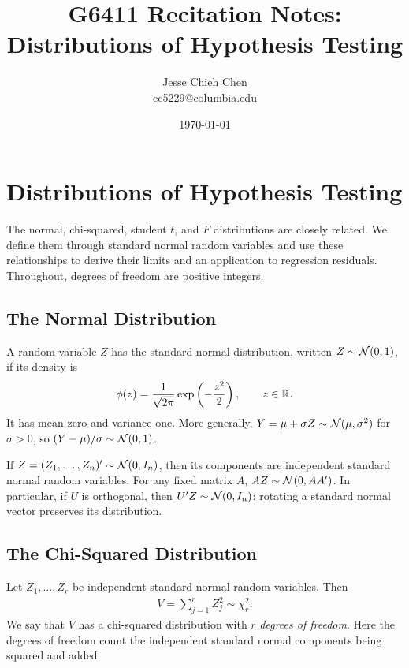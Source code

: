 \documentclass[a4paper,12pt]{article}
\title{G6411 Recitation Notes: Distributions of Hypothesis Testing}
\author{Jesse Chieh Chen\\\href{mailto:cc5229@columbia.edu}{cc5229@columbia.edu}}
\date{\today}
\begin{document}
\appendix
\section{Distributions of Hypothesis Testing}

The normal, chi-squared, student $t$, and $F$ distributions are closely related.
We define them through standard normal random variables and use these relationships
to derive their limits and an application to regression residuals.
Throughout, degrees of freedom are positive integers.

\subsection{The Normal Distribution}

\begin{definition}
	A random variable $Z$ has the standard normal distribution, written $Z\sim\operatorname{\mathcal{N}}(0,1)$,
	if its density is
	\begin{align}
		\phi(z)=\frac{1}{\sqrt{2\pi}}\exp\left(-\frac{z^2}{2}\right),
		\qquad z\in\mathbb{R}.
	\end{align}
	It has mean zero and variance one.
	More generally, $Y=\mu+\sigma Z\sim\operatorname{\mathcal{N}}(\mu,\sigma^2)$ for $\sigma>0$,
	so $(Y-\mu)/\sigma\sim\operatorname{\mathcal{N}}(0,1)$.
\end{definition}

\begin{remark}
	If $Z=(Z_1,\ldots,Z_n)^{\prime}\sim\operatorname{\mathcal{N}}(0,I_n)$,
	then its components are independent standard normal random variables.
	For any fixed matrix $A$, $AZ\sim\operatorname{\mathcal{N}}(0,AA^{\prime})$.
	In particular, if $U$ is orthogonal, then
	$U^{\prime} Z\sim\operatorname{\mathcal{N}}(0,I_n)$:
	rotating a standard normal vector preserves its distribution.
\end{remark}

\subsection{The Chi-Squared Distribution}

\begin{definition}
	Let $Z_1,\ldots,Z_r$ be independent standard normal random variables.
	Then
	\begin{align}
		V=\sum_{j=1}^rZ_j^2\sim\chi_r^2.
	\end{align}
	We say that $V$ has a chi-squared distribution with $r$ \emph{degrees of freedom}.
	Here the degrees of freedom count the independent standard normal components being squared and added.
\end{definition}
\end{document}
